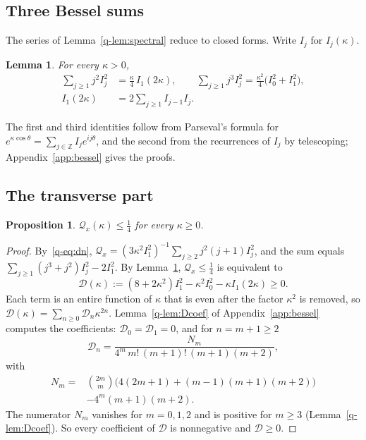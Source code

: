 \documentclass[11pt]{amsart}
\newtheorem{lemma}[theorem]{Lemma}
\newtheorem{proposition}[theorem]{Proposition}
\theoremstyle{definition}
\theoremstyle{remark}
\numberwithin{equation}{section}
\newcommand{\Z}{\mathbb{Z}}
\begin{document}
\subsection{Three Bessel sums}

The series of Lemma~\ref{q-lem:spectral} reduce to closed forms. Write $I_j$
for $I_j(\kappa)$.

\begin{lemma}\label{q-lem:besselsums}
For every $\kappa>0$,
\begin{align*}
\sum_{j\ge1}j^2I_j^2&=\frac\kappa4\,I_1(2\kappa),\qquad
\sum_{j\ge1}j^3I_j^2=\frac{\kappa^2}4\bigl(I_0^2+I_1^2\bigr),\\
I_1(2\kappa)&=2\sum_{j\ge1}I_{j-1}I_j .
\end{align*}
\end{lemma}

The first and third identities follow from Parseval's formula for
$e^{\kappa\cos\theta}=\sum_{j\in\Z}I_je^{ij\theta}$, and the second from the
recurrences of $I_j$ by telescoping; Appendix~\ref{app:bessel} gives the
proofs.

\subsection{The transverse part}

\begin{proposition}\label{q-prop:transverse}
$\mathcal Q_x(\kappa)\le\frac14$ for every $\kappa\ge0$.
\end{proposition}

\begin{proof}
By~\eqref{q-eq:dn}, $\mathcal Q_x=(3\kappa^2I_1^2)^{-1}\sum_{j\ge2}j^2(j+1)
I_j^2$, and the sum equals $\sum_{j\ge1}(j^3+j^2)I_j^2-2I_1^2$. By
Lemma~\ref{q-lem:besselsums}, $\mathcal Q_x\le\frac14$ is equivalent to
\begin{equation}\label{q-eq:Dfunction}
\mathcal D(\kappa):=(8+2\kappa^2)I_1^2-\kappa^2I_0^2-\kappa I_1(2\kappa)\ge0 .
\end{equation}
Each term is an entire function of $\kappa$ that is even after the
factor $\kappa^2$ is removed, so $\mathcal D(\kappa)=\sum_{n\ge0}\mathcal D_n
\kappa^{2n}$. Lemma~\ref{q-lem:Dcoef} of Appendix~\ref{app:bessel} computes the
coefficients: $\mathcal D_0=\mathcal D_1=0$, and for $n=m+1\ge2$
\[
\mathcal D_n=\frac{N_m}{4^m\,m!\,(m+1)!\,(m+1)(m+2)},
\]
with
\[
\begin{aligned}
N_m={}&\binom{2m}m\bigl(4(2m+1)+(m-1)(m+1)(m+2)\bigr)\\
&-4^m(m+1)(m+2).
\end{aligned}
\]
The numerator $N_m$ vanishes for $m=0,1,2$ and is positive for $m\ge3$
(Lemma~\ref{q-lem:Dcoef}). So every coefficient of $\mathcal D$ is nonnegative
and $\mathcal D\ge0$.
\end{proof}
\end{document}
